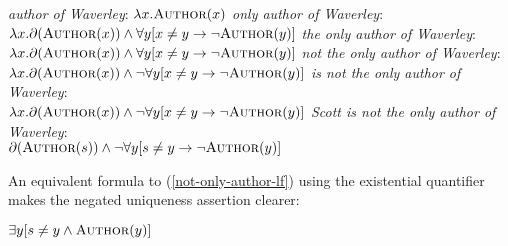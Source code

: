 \begin{exe}
	\ex \label{author-lf} \textit{author of Waverley}: $\lambda x . \textsc{Author}(x)$
	\ex \textit{only author of Waverley}: $\lambda x . \partial(\textsc{Author}(x)) \land \forall y [ x \ne y \to \neg \textsc{Author}(y) ]$
	\ex \textit{the only author of Waverley}: $\lambda x . \partial(\textsc{Author}(x)) \land \forall y [ x \ne y \to \neg \textsc{Author}(y) ]$
	\ex \textit{not the only author of Waverley}: \\ $\lambda x . \partial(\textsc{Author}(x)) \land \neg  \forall y [ x \ne y \to \neg \textsc{Author}(y) ]$
	\ex \textit{is not the only author of Waverley}: \\ $\lambda x . \partial(\textsc{Author}(x)) \land \neg  \forall y [ x \ne y \to \neg \textsc{Author}(y) ]$
	\ex \label{not-only-author-lf} \textit{Scott is not the only author of Waverley}: \\ $\partial(\textsc{Author}(s)) \land \neg \forall y [ s \ne y \to \neg \textsc{Author}(y) ]$
\end{exe}

An equivalent formula to (\ref{not-only-author-lf}) using the existential quantifier makes the negated uniqueness assertion clearer:

\begin{exe}
	\ex \label{not-only-author-lf2} $\exists y [ s \ne y \land \textsc{Author}(y) ]$
\end{exe}